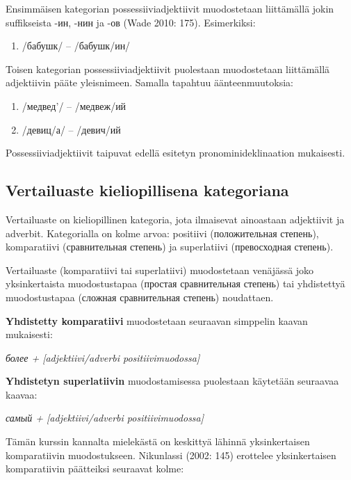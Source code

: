 \documentclass[]{scrreprt}
\providecommand{\tightlist}{%
  \setlength{\itemsep}{0pt}\setlength{\parskip}{0pt}}
\begin{document}
Ensimmäisen kategorian possessiiviadjektiivit muodostetaan liittämällä
jokin suffikseista -ин, -нин ja -ов (Wade 2010: 175). Esimerkiksi:

\begin{enumerate}
\def\labelenumi{(\arabic{enumi})}
\setcounter{enumi}{18}
\tightlist
\item
  /бабушк/ -- /бабушк/ин/
\end{enumerate}

Toisen kategorian possessiiviadjektiivit puolestaan muodostetaan
liittämällä adjektiivin pääte yleisnimeen. Samalla tapahtuu
äänteenmuutoksia:

\begin{enumerate}
\def\labelenumi{(\arabic{enumi})}
\setcounter{enumi}{19}
\tightlist
\item
  /медвед'/ -- /медвеж/ий
\item
  /девиц/а/ -- /девич/ий
\end{enumerate}

Possessiiviadjektiivit taipuvat edellä esitetyn pronominideklinaation
mukaisesti.

\subsection{Vertailuaste kieliopillisena
kategoriana}\label{vertailuaste-kieliopillisena-kategoriana}

Vertailuaste on kieliopillinen kategoria, jota ilmaisevat ainoastaan
adjektiivit ja adverbit. Kategorialla on kolme arvoa: positiivi
(положительная степень), komparatiivi (сравнительная степень) ja
superlatiivi (превосходная степень).

Vertailuaste (komparatiivi tai superlatiivi) muodostetaan venäjässä joko
yksinkertaista muodostustapaa (простая сравнительная степень) tai
yhdistettyä muodostustapaa (сложная сравнительная степень) noudattaen.

\textbf{Yhdistetty komparatiivi} muodostetaan seuraavan simppelin kaavan
mukaisesti:

\emph{более + {[}adjektiivi/adverbi positiivimuodossa{]}}

\textbf{Yhdistetyn superlatiivin} muodostamisessa puolestaan käytetään
seuraavaa kaavaa:

\emph{самый + {[}adjektiivi/adverbi positiivimuodossa{]}}

Tämän kurssin kannalta mielekästä on keskittyä lähinnä yksinkertaisen
komparatiivin muodostukseen. Nikunlassi (2002: 145) erottelee
yksinkertaisen komparatiivin päätteiksi seuraavat kolme:
\end{document}
